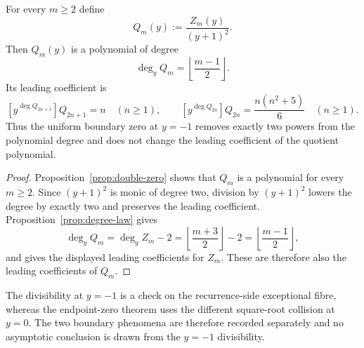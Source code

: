 \begin{corollary}\label{cor:boundary-quotient-degree-law}
For every $m\ge2$ define
\[
Q_m(y):=\frac{Z_m(y)}{(y+1)^2}.
\]
Then $Q_m(y)$ is a polynomial of degree
\begin{equation}\label{eq:boundary-quotient-degree}
\deg_y Q_m=\left\lfloor\frac{m-1}{2}\right\rfloor.
\end{equation}
Its leading coefficient is
\[
[y^{\deg Q_{2n+1}}]Q_{2n+1}=n\quad(n\ge1),
\qquad
[y^{\deg Q_{2n}}]Q_{2n}=\frac{n(n^2+5)}6\quad(n\ge1).
\]
Thus the uniform boundary zero at $y=-1$ removes exactly two powers from the polynomial degree and does not change the leading coefficient of the quotient polynomial.
\end{corollary}

\begin{proof}
Proposition~\ref{prop:double-zero} shows that $Q_m$ is a polynomial for every $m\ge2$.
Since $(y+1)^2$ is monic of degree two, division by $(y+1)^2$ lowers the degree by exactly two and preserves the leading coefficient.
Proposition~\ref{prop:degree-law} gives
\[
\deg_y Q_m=\deg_y Z_m-2
=\left\lfloor\frac{m+3}{2}\right\rfloor-2
=\left\lfloor\frac{m-1}{2}\right\rfloor,
\]
and gives the displayed leading coefficients for $Z_m$.
These are therefore also the leading coefficients of $Q_m$.
\end{proof}

\begin{remark}\label{rem:boundary-rigidity}
The divisibility at $y=-1$ is a check on the recurrence-side exceptional fibre, whereas the endpoint-zero theorem uses the different square-root collision at $y=0$.  The two boundary phenomena are therefore recorded separately and no asymptotic conclusion is drawn from the $y=-1$ divisibility.
\end{remark}

